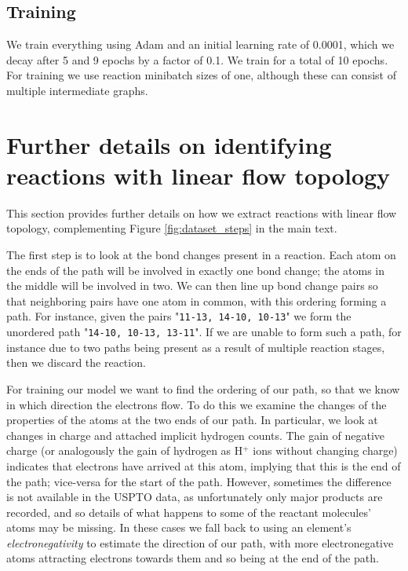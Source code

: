 \subsection{Training}

We train everything using Adam \citep{kingma2014adam} and an initial learning rate of 0.0001, which we decay after 5 and 9 epochs by a factor of 0.1. 
We train for a total of 10 epochs.
For training we use reaction minibatch sizes of one, although these can consist of multiple intermediate graphs.






\section{Further details on identifying reactions with linear flow topology}
\label{sect:electron_path_identify}

This section provides further details on how we extract reactions with linear flow topology, complementing Figure \ref{fig:dataset_steps} in the main text.

The first step is to look at the bond changes present in a reaction. 
Each atom on the ends of the path will be involved in exactly one bond change;
the atoms in the middle will be involved in two. 
We can then line up bond change pairs so that neighboring pairs have one atom in common,
 with this ordering forming a path.
For instance, given the pairs "\texttt{11-13, 14-10, 10-13}" we form the unordered path "\texttt{14-10, 10-13, 13-11}".
If we are unable to form such a path, for instance due to two paths being present as a result of multiple reaction stages, then we discard the reaction.

For training our model we want to find the ordering of our path, so that we know in which direction the electrons flow.
To do this we examine the changes of the properties of the atoms at the two ends of our path. 
In particular, we look at changes in charge and attached implicit hydrogen counts. 
The gain of negative charge (or analogously the gain of hydrogen as H$^+$ ions without changing charge) indicates that electrons have arrived at this atom, 
implying that this is the end of the path; 
vice-versa for the start of the path.
However, sometimes the difference is not available in the USPTO data, as unfortunately only major products are recorded, and so details of what happens to some of the reactant molecules' atoms may be missing.
In these cases we fall back to using an element's {\em electronegativity} to estimate the direction of our path, with more electronegative atoms attracting electrons towards them and so being at the end of the path. 

